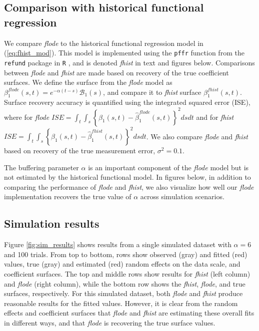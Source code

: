 \documentclass[preprint]{JASA}
\begin{document}
\hypertarget{comparison-with-historical-functional-regression}{%
\subsection{Comparison with historical functional
regression}\label{comparison-with-historical-functional-regression}}

We compare \emph{flode} to the historical functional regression model in
(\ref{eq:fhist_mod}). This model is implemented using the \texttt{pffr}
function from the \texttt{refund} package in \texttt{R} \citep{refund},
and is denoted \emph{fhist} in text and figures below. Comparisons
between \emph{flode} and \emph{fhist} are made based on recovery of the
true coefficient surfaces. We define the surface from the \emph{flode}
model as \(\beta_1^{flode}(s, t) = e^{-\alpha (t-s)} \mathcal{B}_1(s)\),
and compare it to \emph{fhist} surface \(\beta_1^{fhist}(s, t)\).
Surface recovery accuracy is quantified using the integrated squared
error (ISE), where for \emph{flode}
\(ISE = \int_t \int_s \left\{ \beta_1(s, t) - \widehat{\beta}_1^{flode}(s, t) \right\}^2 ds dt\)
and for \emph{fhist}
\(ISE = \int_t \int_s \left\{ \beta_1(s, t) - \widehat{\beta}_1^{fhist}(s, t) \right\}^2 ds dt\).
We also compare \emph{flode} and \emph{fhist} based on recovery of the
true measurement error, \(\sigma^2 = 0.1\).

The buffering parameter \(\alpha\) is an important component of the
\emph{flode} model but is not estimated by the historical functional
model. In figures below, in addition to comparing the performance of
\emph{flode} and \emph{fhist}, we also visualize how well our
\emph{flode} implementation recovers the true value of \(\alpha\) across
simulation scenarios.

\hypertarget{simulation-results}{%
\subsection{Simulation results}\label{simulation-results}}

Figure \ref{fig:sim_results} shows results from a single simulated
dataset with \(\alpha = 6\) and 100 trials. From top to bottom, rows
show observed (gray) and fitted (red) values, true (gray) and estimated
(red) random effects on the data scale, and coefficient surfaces. The
top and middle rows show results for \emph{fhist} (left column) and
\emph{flode} (right column), while the bottom row shows the
\emph{fhist}, \emph{flode}, and true surfaces, respectively. For this
simulated dataset, both \emph{flode} and \emph{fhist} produce reasonable
results for the fitted values. However, it is clear from the random
effects and coefficient surfaces that \emph{flode} and \emph{fhist} are
estimating these overall fits in different ways, and that \emph{flode}
is recovering the true surface values.
\end{document}
